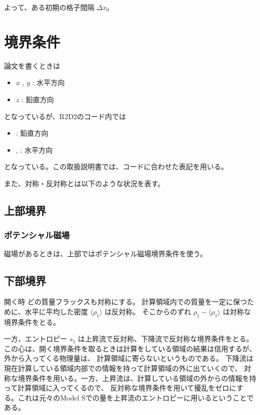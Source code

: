 \documentclass[letterpaper,10pt,dvipdfmx,report]{sphinxmanual}
\let\sphinxpxdimen\pdfpxdimen\else\newdimen\sphinxpxdimen
\begin{document}
よって、ある初期の格子間隔 \(\Delta x_0\)


\chapter{境界条件}
\label{\detokenize{boundary:id1}}\label{\detokenize{boundary::doc}}
論文を書くときは
\begin{itemize}
\item {} 
\(x\) , \(y\) : 水平方向

\item {} 
\(z\) : 鉛直方向

\end{itemize}

となっているが、R2D2のコード内では
\begin{itemize}
\item {} 
: 鉛直方向

\item {} 
, : 水平方向

\end{itemize}

となっている。この取扱説明書では、コードに合わせた表記を用いる。

また、対称・反対称とは以下のような状況を表す。

\noindent\sphinxincludegraphics[width=450\sphinxpxdimen]{{bc_sym}.png}


\section{上部境界}
\label{\detokenize{boundary:id2}}

\subsection{ポテンシャル磁場}
\label{\detokenize{boundary:id3}}
磁場があるときは、上部ではポテンシャル磁場境界条件を使う。


\section{下部境界}
\label{\detokenize{boundary:id4}}
開く時
どの質量フラックスも対称にする。 計算領域内での質量を一定に保つために、水平に平均した密度
\(\langle \rho_1\rangle\) は反対称。 そこからのずれ
\(\rho_1 - \langle \rho_1 \rangle\) は対称な境界条件をとる。

一方、エントロピー \(s_1\) は上昇流で反対称、下降流で反対称な境界条件をとる。
この心は、開く境界条件を取るときは計算をしている領域の結果は信用するが、外から入ってくる物理量は、
計算領域に寄らないというものである。 下降流は現在計算している領域内部での情報を持って計算領域の外に出ていくので、
対称な境界条件を用いる。一方、上昇流は、計算している領域の外からの情報を持って計算領域に入ってくるので、
反対称な境界条件を用いて擾乱をゼロにする。これは元々のModel Sでの量を上昇流のエントロピーに用いるということである。
\end{document}
